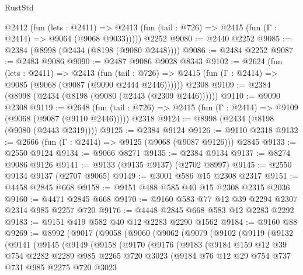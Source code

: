 \begin{lexlean}{RustStd}
\begin{coremodule}
    @2412
      (fun (lets : @2411) =>
      @2413 (fun (tail : @726) => @2415 (fun (Γ : @2414) => @9064 (@9068 @9033)))))
    @2252
@9080 := @2440 @2252
@9085 := @2384 (@8998 (@2434 (@8198 (@9080 @2448))))
@9086 := @2484 @2252
@9087 := @2483 @9086
@9090 := @2487 @9086 @9028 @8343
@9102 := @2624
    (fun (lets : @2411) =>
    @2413
      (fun (tail : @726) => @2415 (fun (Γ : @2414) => @9085 (@9068 (@9087 (@9090 @2444 @2446))))))
    @2308
@9109 := @2384 (@8998 (@2434 (@8198 (@9080 (@2443 (@2309 @2446))))))
@9110 := @9090 @2308
@9119 := @2648
    (fun (tail : @726) => @2415 (fun (Γ : @2414) => @9109 (@9068 (@9087 (@9110 @2446)))))
    @2318
@9124 := @8998 (@2434 (@8198 (@9080 (@2443 @2319))))
@9125 := @2384 @9124
@9126 := @9110 @2318
@9132 := @2666 (fun (Γ : @2414) => @9125 (@9068 (@9087 @9126))) @2845
@9133 := @2550 @9124
@9134 := @9066 @8271
@9135 := @2384 @9134
@9137 := @8274 @9086 @9126
@9141 := @9133 (@9135 @9137) (@2702 @8997)
@9145 := @2550 @9134 @9137 (@2707 @9065)
@9149 := @3001 @586 @15 @2308 @2317
@9151 := @4458 @2845 @668
@9158 := @9151 @488 @585 @40 @15 @2308 @2315 @2036
@9160 := @4471 @2845 @668
@9170 := @9160 @583 @77 @12 @39 @2294 @2307 @2314 @985 @2257 @720
@9176 := @4448 @2845 @668 @583 @12 @2283 @2292
@9183 := @9151 @419 @582 @40 @12 @2283 @2290 @1562
@9184 := @9160 @88
@9269 := @8992
    (@9017
      (@9058
        (@9060
          (@9062
            (@9079
              (@9102
                (@9119
                  (@9132
                    (@9141
                      (@9145
                        (@9149
                          (@9158
                            (@9170
                              (@9176
                                (@9183
                                  (@9184
                                    @159
                                    @12
                                    @39
                                    @754
                                    @2282
                                    @2289
                                    @985
                                    @2265
                                    @720
                                    @3023
                                    (@9184
                                      @76
                                      @12
                                      @29
                                      @754
                                      @737
                                      @731
                                      @985
                                      @2275
                                      @720
                                      @3023

\end{coremodule}
\end{lexlean}
